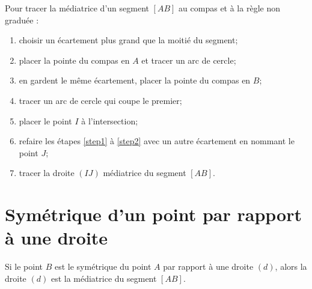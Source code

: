 \documentclass[12pt,a4paper]{article}
\begin{document}
\begin{mymeth}
Pour tracer la médiatrice d'un segment $[AB]$ au compas et à la règle non graduée :

\begin{enumerate}
	\item choisir un écartement plus grand que la moitié du segment;
	\item placer la pointe du compas en $A$ et tracer un arc de cercle;\label{step1}
	\item en gardent le même écartement, placer la pointe du compas en $B$;
	\item tracer un arc de cercle qui coupe le premier;
	\item placer le point $I$ à l'intersection;\label{step2}
	\item refaire les étapes \ref{step1} à \ref{step2} avec un autre écartement en nommant le point $J$;
	\item tracer la droite $(IJ)$ médiatrice du segment $[AB]$.
	
\end{enumerate}
\end{mymeth}

\newpage
\section{Symétrique  d'un point par rapport à une droite}
	
	\begin{myprop}
		Si le point $B$ est le symétrique du point $A$ par rapport à une droite $(d)$, alors la droite $(d)$ est la médiatrice du segment $[AB]$.
	\end{myprop}
\end{document}
